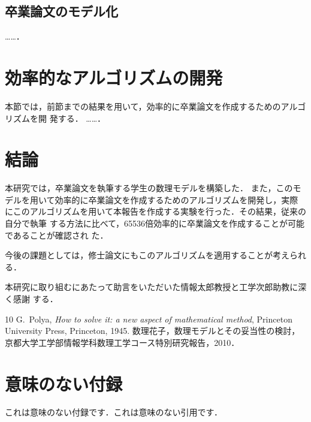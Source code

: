 \documentclass[dvipdfmx]{ampbt}
\begin{document}
\subsection{卒業論文のモデル化}
……．

\section{効率的なアルゴリズムの開発}
本節では，前節までの結果を用いて，効率的に卒業論文を作成するためのアルゴリズムを開
発する．
……．

\section{結論}
本研究では，卒業論文を執筆する学生の数理モデルを構築した．
また，このモデルを用いて効率的に卒業論文を作成するためのアルゴリズムを開発し，実際
にこのアルゴリズムを用いて本報告を作成する実験を行った．その結果，従来の自分で執筆
する方法に比べて，65536倍効率的に卒業論文を作成することが可能であることが確認され
た．

今後の課題としては，修士論文にもこのアルゴリズムを適用することが考えられる．

\acknowledgment
本研究に取り組むにあたって助言をいただいた情報太郎教授と工学次郎助教に深く感謝
する．

\begin{thebibliography}{10}
  G.~Polya, \textit{How to solve it: a new aspect of mathematical method},
  Princeton University Press, Princeton, 1945.
  数理花子，数理モデルとその妥当性の検討，
  京都大学工学部情報学科数理工学コース特別研究報告，2010．
\end{thebibliography}

\appendix

\section{意味のない付録}
これは意味のない付録です．これは意味のない引用です\cite{polya1945}．
\end{document}
